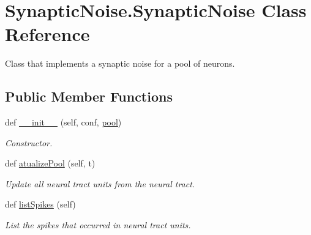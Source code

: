 \hypertarget{class_synaptic_noise_1_1_synaptic_noise}{}\section{Synaptic\+Noise.\+Synaptic\+Noise Class Reference}
\label{class_synaptic_noise_1_1_synaptic_noise}


Class that implements a synaptic noise for a pool of neurons.  


\subsection*{Public Member Functions}
\begin{DoxyCompactItemize}
\item 
def \hyperlink{class_synaptic_noise_1_1_synaptic_noise_a1f6c03281f2569156552c043e5d81db1}{\+\_\+\+\_\+init\+\_\+\+\_\+} (self, conf, \hyperlink{class_synaptic_noise_1_1_synaptic_noise_a7b3350e537e1fcadbf486e851f7f3077}{pool})
\begin{DoxyCompactList}\small\item\em Constructor. \end{DoxyCompactList}\item 
def \hyperlink{class_synaptic_noise_1_1_synaptic_noise_a00fa2c0d5b1b4d5fafc219e32bb4cd42}{atualize\+Pool} (self, t)
\begin{DoxyCompactList}\small\item\em Update all neural tract units from the neural tract. \end{DoxyCompactList}\item 
def \hyperlink{class_synaptic_noise_1_1_synaptic_noise_a8937077070b4e13f4b29ee0c443d3ace}{list\+Spikes} (self)
\begin{DoxyCompactList}\small\item\em List the spikes that occurred in neural tract units. \end{DoxyCompactList}\end{DoxyCompactItemize}
